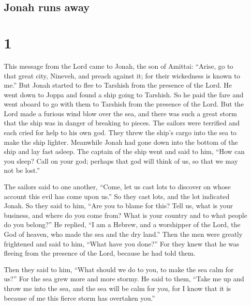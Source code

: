 \hypertarget{jonah-runs-away}{%
\subsection{Jonah runs away}\label{jonah-runs-away}}

\hypertarget{section}{%
\section{1}\label{section}}

 This message from the Lord came to Jonah, the son of
Amittai:  ``Arise, go to that great city, Nineveh, and
preach against it; for their wickedness is known to me.'' 
But Jonah started to flee to Tarshish from the presence of the Lord. He
went down to Joppa and found a ship going to Tarshish. So he paid the
fare and went aboard to go with them to Tarshish from the presence of
the Lord.  But the Lord made a furious wind blow over the
sea, and there was such a great storm that the ship was in danger of
breaking to pieces.  The sailors were terrified and each
cried for help to his own god. They threw the ship's cargo into the sea
to make the ship lighter. Meanwhile Jonah had gone down into the bottom
of the ship and lay fast asleep.  The captain of the ship
went and said to him, ``How can you sleep? Call on your god; perhaps
that god will think of us, so that we may not be lost.''

 The sailors said to one another, ``Come, let us cast lots
to discover on whose account this evil has come upon us.'' So they cast
lots, and the lot indicated Jonah.  So they said to him,
``Are you to blame for this? Tell us, what is your business, and where
do you come from? What is your country and to what people do you
belong?''  He replied, ``I am a Hebrew, and a worshipper of
the Lord, the God of heaven, who made the sea and the dry land.''
 Then the men were greatly frightened and said to him,
``What have you done?'' For they knew that he was fleeing from the
presence of the Lord, because he had told them.

 Then they said to him, ``What should we do to you, to make
the sea calm for us?'' For the sea grew more and more stormy.
 He said to them, ``Take me up and throw me into the sea,
and the sea will be calm for you, for I know that it is because of me
this fierce storm has overtaken you.''

